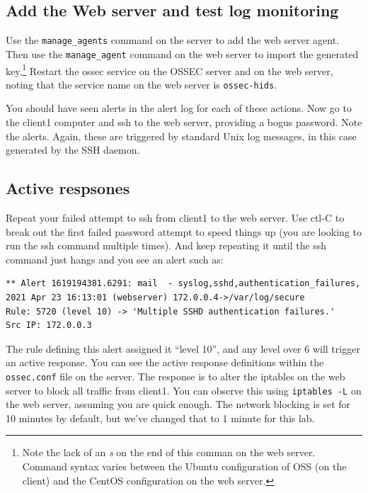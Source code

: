 \subsection{Add the Web server and test log monitoring}
Use the {\tt manage\_agents} command on the server to add the web server agent.  Then use the {\tt manage\_agent} command
on the web server to import the generated key.\footnote{Note the lack of an \textit{s} on the end of this comman on the
web server.  Command syntax varies between the Ubuntu configuration of OSS (on the client) and the CentOS configuration
on the web server.}  Restart the ossec service on the OSSEC server and on the web server, noting that the service name
on the web server is {\tt ossec-hids}.

You should have seen alerts in the alert log for each of these actions.  Now go to the client1 computer and ssh to the web server, 
providing a bogus password.  Note the alerts.  Again, these are triggered by standard Unix log messages, in this case generated
by the SSH daemon.

\subsection{Active respsones}
Repeat your failed attempt to ssh from client1 to the web server.  Use ctl-C to break out the first failed password
attempt to speed things up (you are looking to run the ssh command multiple times).  
And keep repeating it until the ssh command just hangs and you see an alert such as:
\begin{verbatim}
** Alert 1619194381.6291: mail  - syslog,sshd,authentication_failures,
2021 Apr 23 16:13:01 (webserver) 172.0.0.4->/var/log/secure
Rule: 5720 (level 10) -> 'Multiple SSHD authentication failures.'
Src IP: 172.0.0.3
\end{verbatim}
\noindent The rule defining this alert assigned it ``level 10'', and any level over 6 will trigger an active response.
You can see the active response definitions within the {\tt ossec.conf} file on the server.  The response is to alter the
iptables on the web server to block all traffic from client1.  You can observe this using {\tt iptables -L} on the web server,
assuming you are quick enough.
The network blocking is set for 10 minutes by default, but we've changed that to 1 minute for this lab.  

